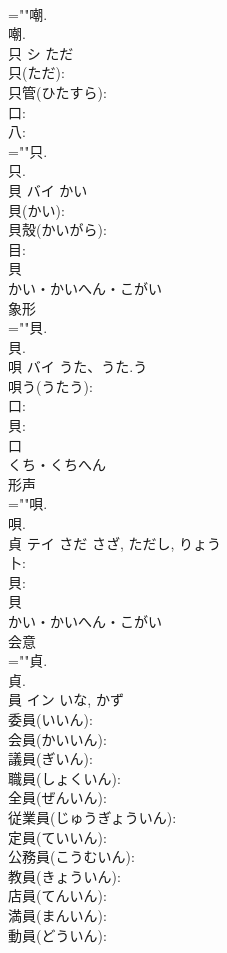 \documentclass[8pt]{extreport}
\begin{document}
\begin{CJK}{UTF8}{min}
\\	=""嘲.
\\	嘲.
\\	只	シ	ただ		
\\	只(ただ): 
\\	只管(ひたすら): 
\\	口: 
\\	八: 
\\	=""只.
\\	只.
\\	貝	バイ	かい		
\\	貝(かい): 
\\	貝殼(かいがら): 
\\	目: 
\\	貝	
\\	かい・かいへん・こがい	
\\	象形 
\\	=""貝.
\\	貝.
\\	唄	バイ	うた、うた.う		
\\	唄う(うたう): 
\\	口: 
\\	貝: 
\\	口	
\\	くち・くちへん	
\\	形声 
\\	=""唄.
\\	唄.
\\	貞	テイ	さだ	さざ, ただし, りょう	
\\	卜: 
\\	貝: 
\\	貝	
\\	かい・かいへん・こがい	
\\	会意 
\\	=""貞.
\\	貞.
\\	員	イン		いな, かず	
\\	委員(いいん): 
\\	会員(かいいん): 
\\	議員(ぎいん): 
\\	職員(しょくいん): 
\\	全員(ぜんいん): 
\\	従業員(じゅうぎょういん): 
\\	定員(ていいん): 
\\	公務員(こうむいん): 
\\	教員(きょういん): 
\\	店員(てんいん): 
\\	満員(まんいん): 
\\	動員(どういん): 

\end{CJK}
\end{document}
